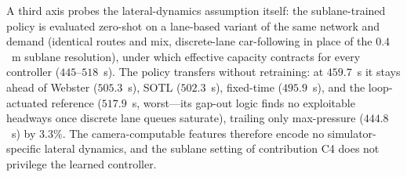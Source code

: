 A third axis probes the lateral-dynamics assumption itself: the sublane-trained policy is
evaluated zero-shot on a lane-based variant of the same network and demand (identical
routes and mix, discrete-lane car-following in place of the $0.4$~m sublane resolution),
under which effective capacity contracts for every controller ($445$--$518$~s). The policy
transfers without retraining: at $459.7$~s it stays ahead of Webster ($505.3$~s), SOTL
($502.3$~s), fixed-time ($495.9$~s), and the loop-actuated reference ($517.9$~s,
worst---its gap-out logic finds no exploitable headways once discrete lane queues
saturate), trailing only max-pressure ($444.8$~s) by $3.3\%$. The camera-computable
features therefore encode no simulator-specific lateral dynamics, and the sublane setting
of contribution C4 does not privilege the learned controller.

